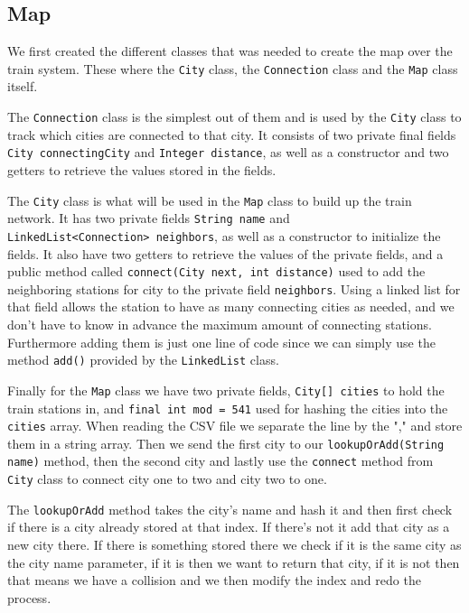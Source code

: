 \documentclass[a4paper,11pt]{article}
\begin{document}
\subsection{Map}
We first created the different classes that was needed to create the map over the train system. These where the {\tt City} class,
the {\tt Connection} class and the {\tt Map} class itself.

The {\tt Connection} class is the simplest out of them and is used by the {\tt City} class to track which cities are
connected to that city. It consists of two private final fields {\tt City connectingCity} and {\tt Integer distance}, as well as a constructor
and two getters to retrieve the values stored in the fields.

The {\tt City} class is what will be used in the {\tt Map} class to build up the train network. It has two private fields {\tt String name}
and \\{\tt LinkedList<Connection> neighbors}, as well as a constructor to initialize the fields. It also have two getters to retrieve the
values of the private fields, and a public method called {\tt connect(City next, int distance)} used to add the neighboring stations for
city to the private field {\tt neighbors}. Using a linked list for that field allows the station to have as many connecting cities as needed,
and we don't have to know in advance the maximum amount of connecting stations. Furthermore adding them is just one line of code since we
can simply use the method {\tt add()} provided by the {\tt LinkedList} class.

Finally for the {\tt Map} class we have two private fields, {\tt City[] cities} to hold the train stations in, and {\tt final int mod = 541}
used for hashing the cities into the {\tt cities} array. When reading the CSV file we separate the line by the "," and store them in a string
array. Then we send the first city to our {\tt lookupOrAdd(String name)} method, then the second city and lastly use the {\tt connect}
method from {\tt City} class to connect city one to two and city two to one.

The {\tt lookupOrAdd} method takes the city's name and hash it and then first check if there is a city already stored at that index. If there's
not it add that city as a new city there. If there is something stored there we check if it is the same city as the city name parameter,
if it is then we want to return that city, if it is not then that means we have a collision and we then modify the index and redo the
process.
\end{document}
